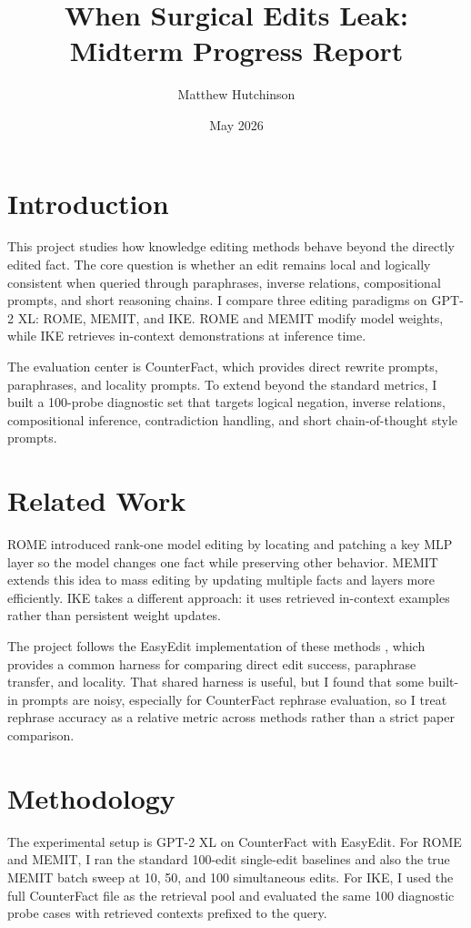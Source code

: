 \documentclass[11pt]{article}
\title{When Surgical Edits Leak:\\Midterm Progress Report}
\author{Matthew Hutchinson}
\date{May 2026}
\begin{document}
\maketitle

\section*{Introduction}
This project studies how knowledge editing methods behave beyond the directly edited fact.
The core question is whether an edit remains local and logically consistent when queried through paraphrases, inverse relations, compositional prompts, and short reasoning chains.
I compare three editing paradigms on GPT-2 XL: ROME, MEMIT, and IKE.
ROME and MEMIT modify model weights, while IKE retrieves in-context demonstrations at inference time.

The evaluation center is CounterFact, which provides direct rewrite prompts, paraphrases, and locality prompts.
To extend beyond the standard metrics, I built a 100-probe diagnostic set that targets logical negation, inverse relations, compositional inference, contradiction handling, and short chain-of-thought style prompts.

\section*{Related Work}
ROME \cite{meng2022rome} introduced rank-one model editing by locating and patching a key MLP layer so the model changes one fact while preserving other behavior.
MEMIT \cite{meng2023memit} extends this idea to mass editing by updating multiple facts and layers more efficiently.
IKE \cite{zeng2023ike} takes a different approach: it uses retrieved in-context examples rather than persistent weight updates.

The project follows the EasyEdit implementation of these methods \cite{easyedit}, which provides a common harness for comparing direct edit success, paraphrase transfer, and locality.
That shared harness is useful, but I found that some built-in prompts are noisy, especially for CounterFact rephrase evaluation, so I treat rephrase accuracy as a relative metric across methods rather than a strict paper comparison.

\section*{Methodology}
The experimental setup is GPT-2 XL on CounterFact with EasyEdit.
For ROME and MEMIT, I ran the standard 100-edit single-edit baselines and also the true MEMIT batch sweep at 10, 50, and 100 simultaneous edits.
For IKE, I used the full CounterFact file as the retrieval pool and evaluated the same 100 diagnostic probe cases with retrieved contexts prefixed to the query.
\end{document}
